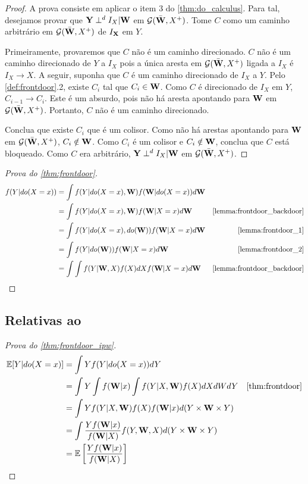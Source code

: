 \begin{proof}
 A prova consiste em aplicar o item 3 do \cref{thm:do_calculus}.
 Para tal, desejamos provar que
 ${\mathbf{Y}} \perp^d I_{X} | {\mathbf{W}}$ em ${\mathcal G}(\bar{{\mathbf{W}}}, X^{+})$.
 Tome $C$ como um caminho arbitrário 
 em ${\mathcal G}(\bar{{\mathbf{W}}}, X^{+})$ de $I_{{\mathbf{X}}}$ em $Y$.
 
 Primeiramente, provaremos que $C$ não é um caminho direcionado.
 $C$ não é um caminho direcionado de $Y$ a $I_{X}$ pois
 a única aresta em ${\mathcal G}(\bar{{\mathbf{W}}}, X^{+})$ ligada a $I_{X}$ é
 $I_{X} \rightarrow X$. A seguir, 
 suponha que $C$ é um caminho direcionado de $I_{X}$ a $Y$.
 Pelo \cref{def:frontdoor}.2, existe $C_i$ tal que
 $C_i \in {\mathbf{W}}$. Como $C$ é direcionado de $I_X$ em $Y$,
 $C_{i-1} \rightarrow C_i$. Este é um absurdo, pois
 não há aresta apontando para ${\mathbf{W}}$ em ${\mathcal G}(\bar{{\mathbf{W}}}, X^{+})$.
 Portanto, $C$ não é um caminho direcionado.
 
 Conclua que existe $C_i$ que é um colisor.
 Como não há arestas apontando para ${\mathbf{W}}$ em ${\mathcal G}(\bar{{\mathbf{W}}}, X^{+})$,
 $C_i \notin {\mathbf{W}}$. Como $C_i$ é um colisor e $C_i \notin {\mathbf{W}}$,
 conclua que $C$ está bloqueado.
 Como $C$ era arbitrário,
 ${\mathbf{Y}} \perp^d I_{X} | {\mathbf{W}}$ em ${\mathcal G}(\bar{{\mathbf{W}}}, X^{+})$.
\end{proof}

\begin{proof}[Prova do \cref{thm:frontdoor}]
 \begin{align*}
  f(Y|do(X=x))
  &= \int f(Y|do(X=x),\W)f(\W|do(X=x))d\W \\
  &= \int f(Y|do(X=x),\W)f(\W|X=x)d\W 
  & \text{\cref{lemma:frontdoor_backdoor}} \\
  &= \int f(Y|do(X=x),do(\W))f(\W|X=x)d\W 
  & \text{\cref{lemma:frontdoor_1}} \\
  &= \int f(Y|do(\W))f(\W|X=x)d\W 
  & \text{\cref{lemma:frontdoor_2}} \\
  &= \int \int f(Y|\W,X)f(X)dX f(\W|X=x)d\W
  & \text{\cref{lemma:frontdoor_backdoor}}
 \end{align*}
\end{proof}

\subsection{Relativas ao }

\begin{proof}[Prova do \cref{thm:frontdoor_ipw}]
 \begin{align*}
  \E[Y|do(X=x)]
  &= \int Y f(Y|do(X=x)) dY \\
  &= \int Y \int f(\W|x) \int f(Y|X,\W)f(X)dXdWdY 
  & \text{\cref{thm:frontdoor}} \\
  &= \int Y f(Y|X,\W)f(X) f(\W|x) d(Y \times \W \times Y) \\
  &= \int \frac{Y f(\W|x)}{f(\W|X)} f(Y,\W,X) d(Y \times \W \times Y) \\
  &= \E\left[\frac{Y f(\W|x)}{f(\W|X)} \right]
 \end{align*}
\end{proof}


